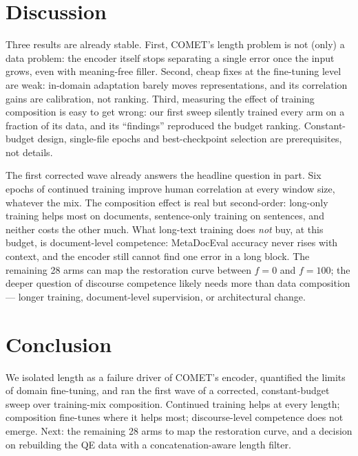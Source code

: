 \documentclass[11pt]{article}
\begin{document}
\section{Discussion}

Three results are already stable.
First, COMET's length problem is not (only) a data problem: the encoder itself stops separating a single error once the input grows, even with meaning-free filler.
Second, cheap fixes at the fine-tuning level are weak: in-domain adaptation barely moves representations, and its correlation gains are calibration, not ranking.
Third, measuring the effect of training composition is easy to get wrong: our first sweep silently trained every arm on a fraction of its data, and its ``findings'' reproduced the budget ranking.
Constant-budget design, single-file epochs and best-checkpoint selection are prerequisites, not details.

The first corrected wave already answers the headline question in part.
Six epochs of continued training improve human correlation at every window size, whatever the mix.
The composition effect is real but second-order: long-only training helps most on documents, sentence-only training on sentences, and neither costs the other much.
What long-text training does \emph{not} buy, at this budget, is document-level competence: MetaDocEval accuracy never rises with context, and the encoder still cannot find one error in a long block.
The remaining 28 arms can map the restoration curve between $f{=}0$ and $f{=}100$; the deeper question of discourse competence likely needs more than data composition --- longer training, document-level supervision, or architectural change.

\section{Conclusion}

We isolated length as a failure driver of COMET's encoder, quantified the limits of domain fine-tuning, and ran the first wave of a corrected, constant-budget sweep over training-mix composition.
Continued training helps at every length; composition fine-tunes where it helps most; discourse-level competence does not emerge.
Next: the remaining 28 arms to map the restoration curve, and a decision on rebuilding the QE data with a concatenation-aware length filter.
\end{document}
